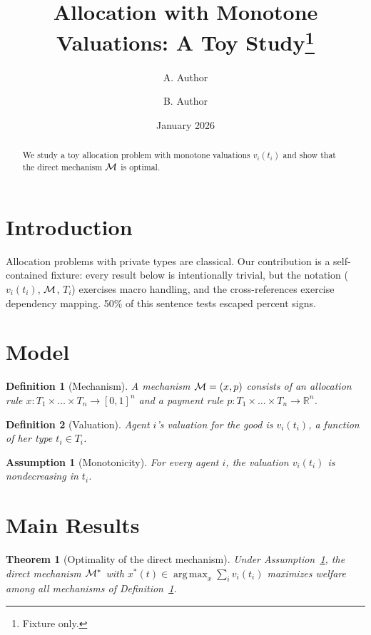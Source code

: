 \documentclass{article}
\title{Allocation with Monotone Valuations: A Toy Study\thanks{Fixture only.}}
\author{A. Author \and B. Author}
\date{January 2026}
\newcommand{\val}{v_i(t_i)}
\newcommand{\typespace}[1]{T_{#1}}
\DeclareMathOperator*{\argmax}{arg\,max}
\newtheorem{theorem}{Theorem}
\newtheorem{definition}{Definition}
\newtheorem{assumption}{Assumption}
\begin{document}
\maketitle

\begin{abstract}
We study a toy allocation problem with monotone valuations $\val$ and show
that the direct mechanism $\mathcal{M}$ is optimal. %
\end{abstract}

\section{Introduction}
Allocation problems with private types are classical. Our contribution is a
self-contained fixture: every result below is intentionally trivial, but the
notation ($\val$, $\mathcal{M}$, $\typespace{i}$) exercises macro handling, and the
cross-references exercise dependency mapping. 50\% of this sentence tests
escaped percent signs.

\section{Model}

\begin{definition}[Mechanism]\label{def:mechanism}
A \emph{mechanism} $\mathcal{M} = (x, p)$ consists of an allocation rule
$x : \typespace{1} \times \dots \times \typespace{n} \to [0,1]^n$ and a
payment rule $p : \typespace{1} \times \dots \times \typespace{n} \to \mathbb{R}^n$.
\end{definition}

\begin{definition}[Valuation]\label{def:valuation}
Agent $i$'s \emph{valuation} for the good is $\val$, a function of her type
$t_i \in \typespace{i}$.
\end{definition}

\begin{assumption}[Monotonicity]\label{ass:mono}
For every agent $i$, the valuation $\val$ is nondecreasing in $t_i$.
\end{assumption}

\section{Main Results}

\begin{theorem}[Optimality of the direct mechanism]\label{thm:main}
Under Assumption~\ref{ass:mono}, the direct mechanism $\mathcal{M}^{*}$ with
$x^{*}(t) \in \argmax_{x} \sum_i \val$ maximizes welfare among all mechanisms
of Definition~\ref{def:mechanism}.
\end{theorem}
\end{document}
